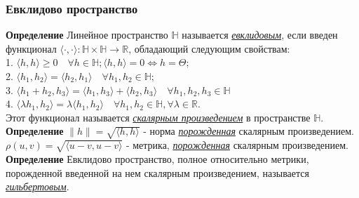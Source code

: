 \documentclass[A4]{article}
\begin{document}
\subsubsection{Евклидово пространство}
\textbf{Определение} Линейное пространство $\mathbb{H}$ называется \underline{\emph{евклидовым}}, если введен функционал $\langle\cdot,\cdot\rangle:\mathbb{H}\times\mathbb{H}\rightarrow\mathbb{R}$, обладающий следующим свойствам:\\
1. $\langle h,h\rangle\geqslant0\quad\forall h\in\mathbb{H};\langle h,h\rangle=0\Leftrightarrow h=\Theta;$\\
2. $\langle h_1,h_2\rangle=\langle h_2,h_1\rangle\quad\forall h_1,h_2\in\mathbb{H};$\\
3. $\langle h_1+h_2,h_3\rangle=\langle h_1,h_3\rangle +\langle h_2,h_3\rangle\quad\forall h_1,h_2,h_3\in\mathbb{H}$\\
4. $\langle \lambda h_1,h_2\rangle=\lambda\langle h_1,h_2\rangle\quad\forall h_1,h_2\in\mathbb{H},\forall\lambda\in\mathbb{R}.$\\
Этот функционал называется \underline{\emph{скалярным произведением}} в пространстве $\mathbb{H}$.\\
\textbf{Определение} $\|h\|=\sqrt{\langle h,h\rangle}$ - норма \underline{\emph{порожденная}} скалярным произведением. $\rho(u,v)=\sqrt{\langle u-v,u-v\rangle}$ - метрика, \underline{\emph{порожденная}} скалярным произведением.\\
\textbf{Определение} Евклидово пространство, полное относительно метрики, порожденной введенной на нем скалярным произведением, называется \underline{\emph{гильбертовым}}.\\
\end{document}
